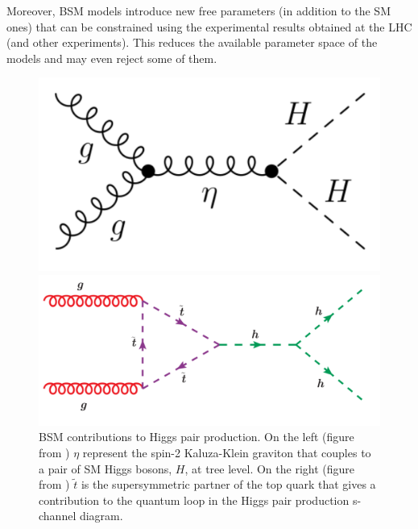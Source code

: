 Moreover, BSM models introduce new free parameters (in addition to the SM ones) that can be constrained using the experimental results obtained at the LHC (and other experiments). This reduces the available parameter space of the models and may even reject some of them.

\begin{figure}
	\centering
	\begin{minipage}{.5\textwidth}
		\centering
		\includegraphics[trim={0cm 0cm 0cm 0cm},clip,width=.7\linewidth]{./Figures/graviton.png}
	\end{minipage}%
	\begin{minipage}{.5\textwidth}
		\centering
		\includegraphics[trim={0cm .5cm 0cm 0cm},clip,width=\linewidth]{./Figures/susy.png}
	\end{minipage}
	\label{fig:BSM_diag}
	\caption{BSM contributions to Higgs pair production. On the left (figure from \cite{hhBSMgrav}) $\eta$ represent the spin-2 Kaluza-Klein graviton that couples to a pair of SM Higgs bosons, $H$, at tree level. On the right (figure from \cite{hhBSMsusy}) $\tilde{t}$ is the supersymmetric partner of the top quark that gives a contribution to the quantum loop in the Higgs pair production s-channel diagram.}
\end{figure}


